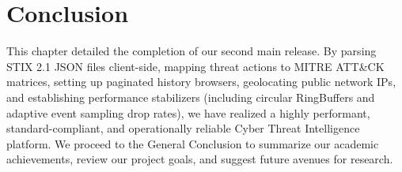 \section{Conclusion}
This chapter detailed the completion of our second main release. By parsing STIX 2.1 JSON files client-side, mapping threat actions to MITRE ATT\&CK matrices, setting up paginated history browsers, geolocating public network IPs, and establishing performance stabilizers (including circular RingBuffers and adaptive event sampling drop rates), we have realized a highly performant, standard-compliant, and operationally reliable Cyber Threat Intelligence platform. We proceed to the General Conclusion to summarize our academic achievements, review our project goals, and suggest future avenues for research.

